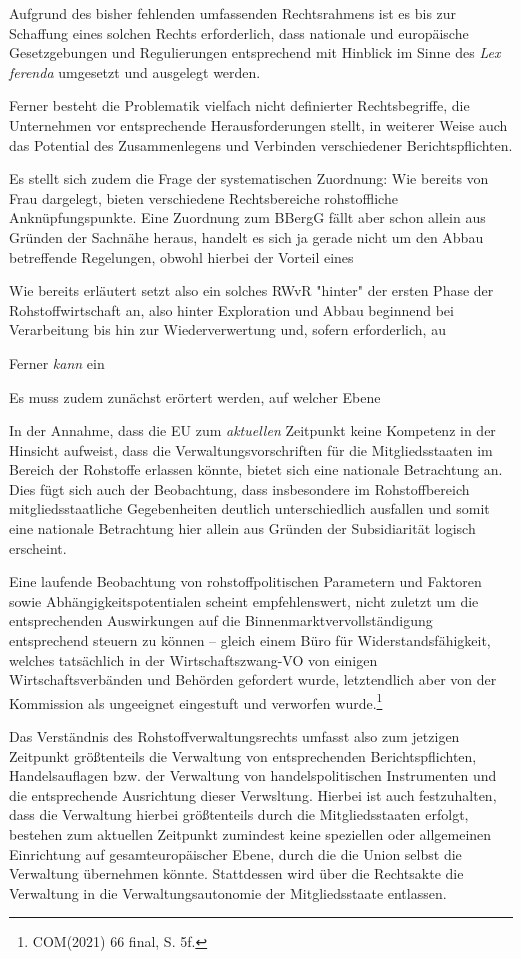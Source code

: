 \documentclass[12pt,a4paper,oneside]{book} %
\begin{document}
Aufgrund des bisher fehlenden umfassenden Rechtsrahmens ist es bis zur Schaffung eines solchen Rechts erforderlich, dass nationale und europäische Gesetzgebungen und Regulierungen entsprechend mit Hinblick im Sinne des \textit{Lex ferenda} umgesetzt und ausgelegt werden. 

Ferner besteht die Problematik vielfach nicht definierter Rechtsbegriffe, die Unternehmen vor entsprechende Herausforderungen stellt, in weiterer Weise auch das Potential des Zusammenlegens und Verbinden verschiedener Berichtspflichten.\autocite{Schäffer, EuZW 2023, 695, 700}

Es stellt sich zudem die Frage der systematischen Zuordnung: Wie bereits von Frau \autocite{frau2023} dargelegt, bieten verschiedene Rechtsbereiche rohstoffliche Anknüpfungspunkte. Eine Zuordnung zum BBergG fällt aber schon allein aus Gründen der Sachnähe heraus, handelt es sich ja gerade nicht um den Abbau betreffende Regelungen, obwohl hierbei der Vorteil eines

Wie bereits erläutert setzt also ein solches RWvR "hinter" der ersten Phase der Rohstoffwirtschaft an, also hinter Exploration und Abbau beginnend bei Verarbeitung bis hin zur Wiederverwertung und, sofern erforderlich, au

Ferner \textit{kann} ein 

Es muss zudem zunächst erörtert werden, auf welcher Ebene

In der Annahme, dass die EU zum \textit{aktuellen} Zeitpunkt keine Kompetenz in der Hinsicht aufweist, dass die Verwaltungsvorschriften für die Mitgliedsstaaten im Bereich der Rohstoffe erlassen könnte, bietet sich eine nationale Betrachtung an. Dies fügt sich auch der Beobachtung, dass insbesondere im Rohstoffbereich mitgliedsstaatliche Gegebenheiten deutlich unterschiedlich ausfallen und somit eine nationale Betrachtung hier allein aus Gründen der Subsidiarität logisch erscheint.

Eine laufende Beobachtung von rohstoffpolitischen Parametern und Faktoren sowie Abhängigkeitspotentialen scheint empfehlenswert, nicht zuletzt um die entsprechenden Auswirkungen auf die Binnenmarktvervollständigung entsprechend steuern zu können -- gleich einem \glqq Büro für Widerstandsfähigkeit\grqq, welches tatsächlich in der Wirtschaftszwang-VO von einigen Wirtschaftsverbänden und Behörden gefordert wurde, letztendlich aber von der Kommission als ungeeignet eingestuft und verworfen wurde.\footnote{COM(2021) 66 final, S. 5f.}

Das Verständnis des Rohstoffverwaltungsrechts umfasst also zum jetzigen Zeitpunkt größtenteils die Verwaltung von entsprechenden Berichtspflichten, Handelsauflagen bzw. der Verwaltung von handelspolitischen Instrumenten und die entsprechende Ausrichtung dieser Verwsltung. Hierbei ist auch festzuhalten, dass die Verwaltung hierbei größtenteils durch die Mitgliedsstaaten erfolgt, bestehen zum aktuellen Zeitpunkt zumindest keine speziellen oder allgemeinen Einrichtung auf gesamteuropäischer Ebene, durch die die Union selbst die Verwaltung übernehmen könnte. Stattdessen wird über die Rechtsakte die Verwaltung in die Verwaltungsautonomie der Mitgliedsstaate entlassen.
\end{document}
